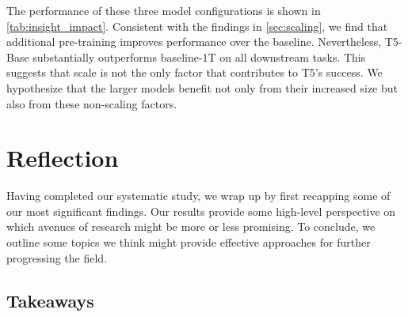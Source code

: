 The performance of these three model configurations is shown in \ref{tab:insight_impact}.
Consistent with the findings in \ref{sec:scaling}, we find that additional pre-training improves performance over the baseline. Nevertheless, T5-Base substantially outperforms baseline-1T on all downstream tasks. This suggests that scale is not the only factor that contributes to T5's success. We hypothesize that the larger models benefit not only from their increased size but also from these non-scaling factors.

\section{Reflection}
\label{sec:conclusion}

Having completed our systematic study, we wrap up by first recapping some of our most significant findings. Our results provide some high-level perspective on which avenues of research might be more or less promising. To conclude, we outline some topics we think might provide effective approaches for further progressing the field.

\subsection{Takeaways}

